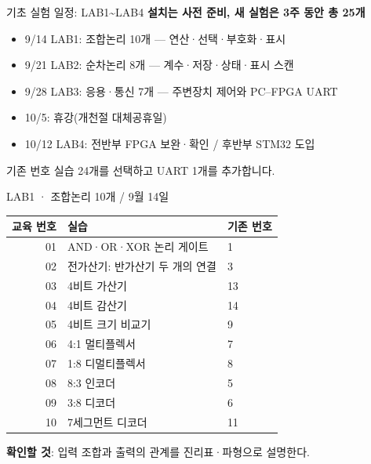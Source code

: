 \documentclass[aspectratio=169,11pt,t]{beamer}
\begin{document}
\begin{frame}{기초 실험 일정: LAB1\textasciitilde{}LAB4}
\textbf{설치는 사전 준비, 새 실험은 3주 동안 총 25개}
\vspace{0.25cm}
\begin{itemize}
\item 9/14 LAB1: 조합논리 10개 --- 연산·선택·부호화·표시
\item 9/21 LAB2: 순차논리 8개 --- 계수·저장·상태·표시 스캔
\item 9/28 LAB3: 응용·통신 7개 --- 주변장치 제어와 PC--FPGA UART
\item 10/5: 휴강(개천절 대체공휴일)
\item 10/12 LAB4: 전반부 FPGA 보완·확인 / 후반부 STM32 도입
\end{itemize}
\vspace{0.2cm}
기존 번호 실습 24개를 선택하고 UART 1개를 추가합니다.
\end{frame}

\begin{frame}{LAB1 · 조합논리 10개 / 9월 14일}
\small
\begin{tabular}{rll}
\textbf{교육 번호} & \textbf{실습} & \textbf{기존 번호}\\\hline
01 & AND·OR·XOR 논리 게이트 & 1\\
02 & 전가산기: 반가산기 두 개의 연결 & 3\\
03 & 4비트 가산기 & 13\\
04 & 4비트 감산기 & 14\\
05 & 4비트 크기 비교기 & 9\\
06 & 4:1 멀티플렉서 & 7\\
07 & 1:8 디멀티플렉서 & 8\\
08 & 8:3 인코더 & 5\\
09 & 3:8 디코더 & 6\\
10 & 7세그먼트 디코더 & 11
\end{tabular}
\vspace{0.2cm}\par
\textbf{확인할 것}: 입력 조합과 출력의 관계를 진리표·파형으로 설명한다.
\end{frame}
\end{document}
